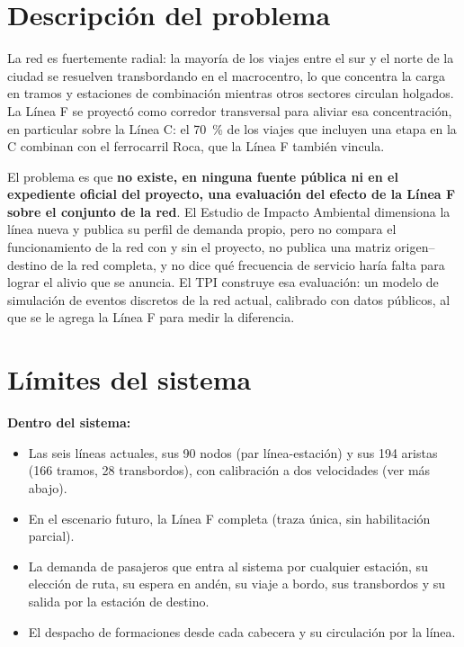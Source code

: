 \documentclass{article}
\begin{document}
\section{Descripción del problema}

La red es fuertemente radial: la mayoría de los viajes entre el sur y el norte de la
ciudad se resuelven transbordando en el macrocentro, lo que concentra la carga en
tramos y estaciones de combinación mientras otros sectores circulan holgados. La
Línea F se proyectó como corredor transversal para aliviar esa concentración, en
particular sobre la Línea C: el 70~\% de los viajes que incluyen una etapa en la C
combinan con el ferrocarril Roca, que la Línea F también vincula.

El problema es que \textbf{no existe, en ninguna fuente pública ni en el expediente
oficial del proyecto, una evaluación del efecto de la Línea F sobre el conjunto de la
red}. El Estudio de Impacto Ambiental dimensiona la línea nueva y publica su perfil
de demanda propio, pero no compara el funcionamiento de la red con y sin el
proyecto, no publica una matriz origen--destino de la red completa, y no dice qué
frecuencia de servicio haría falta para lograr el alivio que se anuncia. El TPI
construye esa evaluación: un modelo de simulación de eventos discretos de la red
actual, calibrado con datos públicos, al que se le agrega la Línea F para medir la
diferencia.

\section{Límites del sistema}

\textbf{Dentro del sistema:}
\begin{itemize}
  \item Las seis líneas actuales, sus 90 nodos (par línea-estación) y sus
    194 aristas (166 tramos, 28 transbordos), con calibración a dos velocidades (ver
    más abajo).
  \item En el escenario futuro, la Línea F completa (traza única, sin habilitación
    parcial).
  \item La demanda de pasajeros que entra al sistema por cualquier estación, su
    elección de ruta, su espera en andén, su viaje a bordo, sus transbordos y su
    salida por la estación de destino.
  \item El despacho de formaciones desde cada cabecera y su circulación por la línea.
\end{itemize}
\end{document}
